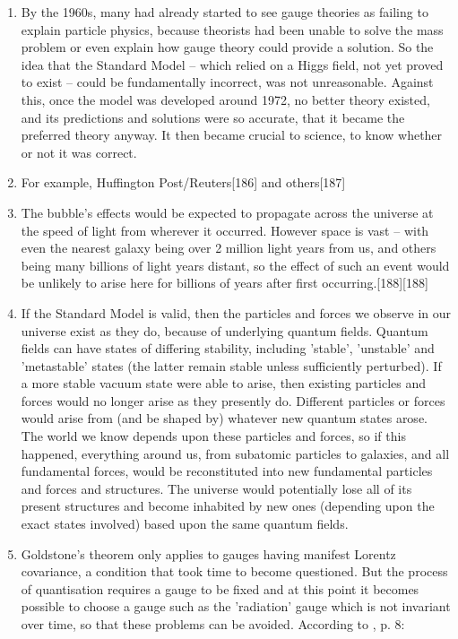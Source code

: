 \begin{enumerate}
\item By the 1960s, many had already started to see gauge theories as failing to explain particle physics, because theorists had been unable to solve the mass problem or even explain how gauge theory could provide a solution. So the idea that the Standard Model – which relied on a Higgs field, not yet proved to exist – could be fundamentally incorrect, was not unreasonable. Against this, once the model was developed around 1972, no better theory existed, and its predictions and solutions were so accurate, that it became the preferred theory anyway. It then became crucial to science, to know whether or not it was correct.
\item For example, Huffington Post/Reuters[186] and others[187]
\item The bubble's effects would be expected to propagate across the universe at the speed of light from wherever it occurred. However space is vast – with even the nearest galaxy being over 2 million light years from us, and others being many billions of light years distant, so the effect of such an event would be unlikely to arise here for billions of years after first occurring.[188][188]
\item If the Standard Model is valid, then the particles and forces we observe in our universe exist as they do, because of underlying quantum fields. Quantum fields can have states of differing stability, including 'stable', 'unstable' and 'metastable' states (the latter remain stable unless sufficiently perturbed). If a more stable vacuum state were able to arise, then existing particles and forces would no longer arise as they presently do. Different particles or forces would arise from (and be shaped by) whatever new quantum states arose. The world we know depends upon these particles and forces, so if this happened, everything around us, from subatomic particles to galaxies, and all fundamental forces, would be reconstituted into new fundamental particles and forces and structures. The universe would potentially lose all of its present structures and become inhabited by new ones (depending upon the exact states involved) based upon the same quantum fields.
\item Goldstone's theorem only applies to gauges having manifest Lorentz covariance, a condition that took time to become questioned. But the process of quantisation requires a gauge to be fixed and at this point it becomes possible to choose a gauge such as the 'radiation' gauge which is not invariant over time, so that these problems can be avoided. According to , p. 8:

\end{enumerate}
